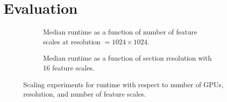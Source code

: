 \documentclass[sigconf,nonacm]{acmart}
\begin{document}








\section{Evaluation}\label{sec:evaluation}




\begin{figure}
    \centering
    \begin{subfigure}[b]{0.5\textwidth}
        \centering
        
        \caption{Median runtime as a function of number of feature scales at resolution $=1024 \times 1024$.}
        \label{subfig:nbins}
    \end{subfigure}
    \par\medskip
    \begin{subfigure}[b]{0.5\textwidth}
        \centering
        
        \caption{Median runtime as a function of section resolution with 16 feature scales.}
        \label{subfig:res}
    \end{subfigure}
    \caption{Scaling experiments for runtime with respect to number of GPUs, resolution, and number of feature scales.}
    \label{fig:evalplots}
\end{figure}
\end{document}
